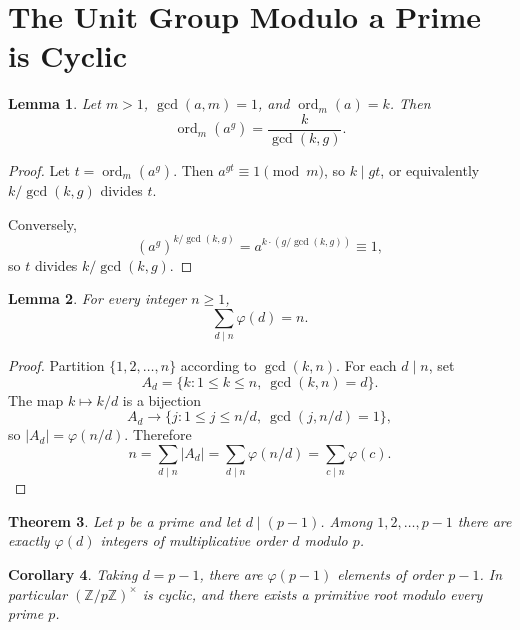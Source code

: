 \documentclass[11pt]{article}
\newtheorem{theorem}{Theorem}[section]
\newtheorem{lemma}[theorem]{Lemma}
\newtheorem{corollary}[theorem]{Corollary}
\theoremstyle{remark}
\DeclareMathOperator{\gcdop}{gcd}
\DeclareMathOperator{\ord}{ord}
\newcommand{\phiE}{\varphi}
\newcommand{\units}[1]{\left(\mathbb Z/#1\mathbb Z\right)^\times}
\begin{document}
\section{The Unit Group Modulo a Prime is Cyclic}

\begin{lemma}
Let $m>1$, $\gcdop(a,m)=1$, and $\ord_m(a)=k$. Then
\[
    \ord_m(a^g)
    =
    \frac{k}{\gcdop(k,g)}.
\]
\end{lemma}

\begin{proof}
Let $t=\ord_m(a^g)$. Then $a^{gt}\equiv 1\pmod m$, so $k\mid gt$, or
equivalently $k/\gcdop(k,g)$ divides $t$.

Conversely,
\[
    (a^g)^{k/\gcdop(k,g)}=a^{k\cdot(g/\gcdop(k,g))}\equiv 1,
\]
so $t$ divides $k/\gcdop(k,g)$.
\end{proof}

\begin{lemma}
For every integer $n\ge 1$,
\[
    \sum_{d\mid n}\phiE(d)=n.
\]
\end{lemma}

\begin{proof}
Partition $\{1,2,\ldots,n\}$ according to $\gcdop(k,n)$. For each $d\mid n$,
set
\[
    A_d=\{k:1\le k\le n,\ \gcdop(k,n)=d\}.
\]
The map $k\mapsto k/d$ is a bijection
\[
    A_d
    \longrightarrow
    \{j:1\le j\le n/d,\ \gcdop(j,n/d)=1\},
\]
so $|A_d|=\phiE(n/d)$. Therefore
\[
    n=\sum_{d\mid n}|A_d|=\sum_{d\mid n}\phiE(n/d)=\sum_{c\mid n}\phiE(c).
\]
\end{proof}

\begin{theorem}
Let $p$ be a prime and let $d\mid(p-1)$. Among $1,2,\ldots,p-1$ there are
exactly $\phiE(d)$ integers of multiplicative order $d$ modulo $p$.
\end{theorem}

\begin{corollary}
Taking $d=p-1$, there are $\phiE(p-1)$ elements of order $p-1$. In
particular $\units p$ is cyclic, and there exists a primitive root modulo
every prime $p$.
\end{corollary}
\end{document}
